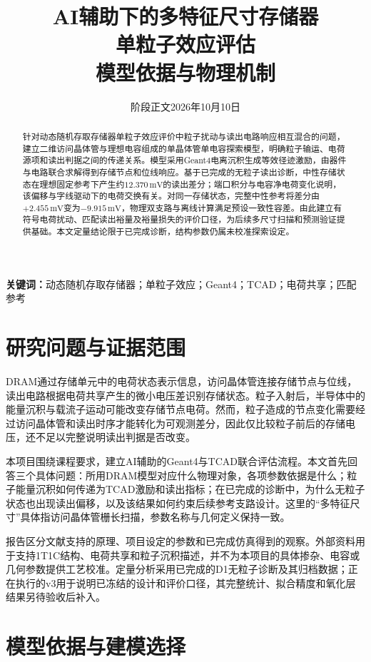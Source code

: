 \documentclass[UTF8,a4paper,zihao=-4,fontset=fandol]{ctexart}
\title{\heiti\LARGE AI辅助下的多特征尺寸存储器\\单粒子效应评估\\[0.6em]\large 模型依据与物理机制}
\author{}
\date{\small 阶段正文\quad 2026年10月10日}
\newcommand{\mV}{\,\mathrm{mV}}
\begin{document}
\maketitle
\thispagestyle{plain}
\vspace{-1.7em}
\begin{abstract}
针对动态随机存取存储器单粒子效应评价中粒子扰动与读出电路响应相互混合的问题，建立二维访问晶体管与理想电容组成的单晶体管单电容探索模型，明确粒子输运、电荷源项和读出判据之间的传递关系。模型采用Geant4电离沉积生成等效径迹激励，由器件与电路联合求解得到存储节点和位线响应。基于已完成的无粒子读出诊断，中性存储状态在理想固定参考下产生约$12.370\mV$的读出差分；端口积分与电容净电荷变化说明，该偏移与字线驱动下的电荷交换有关。对同一存储状态，完整中性参考将差分由$+2.455\mV$变为$-9.915\mV$，物理双支路与离线计算满足预设一致性容差。由此建立有符号电荷扰动、匹配读出裕量及裕量损失的评价口径，为后续多尺寸扫描和预测验证提供基础。本文定量结论限于已完成诊断，结构参数仍属未校准探索设定。
\end{abstract}
\noindent\textbf{关键词：}动态随机存取存储器；单粒子效应；Geant4；TCAD；电荷共享；匹配参考

\section{研究问题与证据范围}
DRAM通过存储单元中的电荷状态表示信息，访问晶体管连接存储节点与位线，读出电路根据电荷共享产生的微小电压差识别存储状态\cite{keeth2001}。粒子入射后，半导体中的能量沉积与载流子运动可能改变存储节点电荷。然而，粒子造成的节点变化需要经过访问晶体管和读出时序才能转化为可观测差分，因此仅比较粒子前后的存储电压，还不足以完整说明读出判据是否改变。

本项目围绕课程要求，建立AI辅助的Geant4与TCAD联合评估流程\cite{course}。本文首先回答三个具体问题：所用DRAM模型对应什么物理对象，各项参数依据是什么；粒子能量沉积如何传递为TCAD激励和读出指标；在已完成的诊断中，为什么无粒子状态也出现读出偏移，以及该结果如何约束后续参考支路设计。这里的“多特征尺寸”具体指访问晶体管栅长扫描，参数名称与几何定义保持一致。

报告区分文献支持的原理、项目设定的参数和已完成仿真得到的观察。外部资料用于支持1T1C结构、电荷共享和粒子沉积描述，并不为本项目的具体掺杂、电容或几何参数提供工艺校准。定量分析采用已完成的D1无粒子诊断及其归档数据\cite{d1}；正在执行的v3用于说明已冻结的设计和评价口径，其完整统计、拟合精度和氧化层结果另待验收后补入。

\section{模型依据与建模选择}
\end{document}

